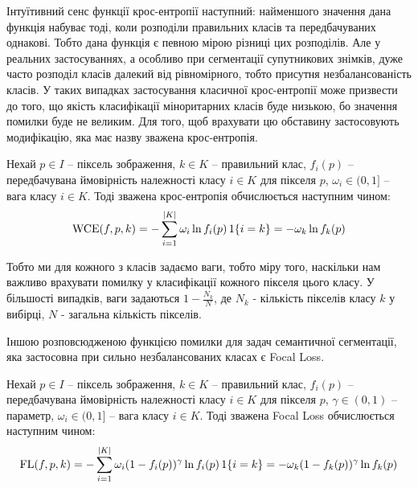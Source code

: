 Інтуїтивний сенс функції крос-ентропії наступний: найменшого значення дана функція набуває тоді,
коли розподіли правильних класів та передбачуваних однакові. Тобто
дана функція є певною мірою різниці цих розподілів. Але у реальних
застосуваннях, а особливо при сегментації супутникових знімків,
дуже часто розподіл класів далекий від рівномірного, тобто
присутня незбалансованість класів. У таких випадках застосування
класичної крос-ентропії може призвести \cite{losses} до того, що
якість класифікації міноритарних класів буде низькою, бо
значення помилки буде не великим. Для того, щоб врахувати цю обставину
застосовують модифікацію, яка має назву зважена крос-ентропія.

\begin{definition}\label{def:wce_loss}
    Нехай $p \in I$ -- піксель зображення, $k \in K$ -- правильний клас,
    $f_i(p)$ -- передбачувана ймовірність належності класу $i \in K$ для пікселя $p$,
    $\omega_i \in (0, 1]$ -- вага класу $i \in K$.
    Тоді зважена крос-ентропія обчислюється наступним чином:
    \begin{equation*}
        \operatorname{WCE}(f, p, k) = - \sum\limits_{i=1}^{|K|} \omega_i \ln f_i(p) \operatorname{1}\{i = k\} =
        -\omega_k \ln f_k(p)
    \end{equation*}
\end{definition}

Тобто ми для кожного з класів задаємо ваги, тобто міру того, наскільки нам важливо
врахувати помилку у класифікації кожного пікселя цього класу. У більшості випадків,
ваги задаються $1 - \frac{N_k}{N}$, де $N_k$ - кількість пікселів класу $k$
у вибірці, $N$ - загальна кількість пікселів.

Іншою розповсюдженою функцією помилки для задач семантичної сегментації,
яка застосовна \cite{losses} при сильно незбалансованих класах є Focal Loss.

\begin{definition}\label{def:focal_loss}
    Нехай $p \in I$ -- піксель зображення, $k \in K$ -- правильний клас,
    $f_i(p)$ -- передбачувана ймовірність належності класу $i \in K$ для пікселя $p$,
    $\gamma \in (0, 1)$ -- параметр, $\omega_i \in (0, 1]$ -- вага класу $i \in K$.
    Тоді зважена Focal Loss обчислюється наступним чином:
    \begin{equation*}
        \operatorname{FL}(f, p, k) = - \sum\limits_{i=1}^{|K|} \omega_i (1 - f_i(p))^\gamma \ln f_i(p) \operatorname{1}\{i = k\} =
        - \omega_k (1 - f_k(p))^\gamma \ln f_k(p)
    \end{equation*}
\end{definition}

